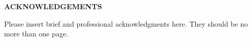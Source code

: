 


\begin{center}

\end{center}
\begin{center}

{\bf\fontsize{14pt}{14.5pt}\selectfont \uppercase{Acknowledgements}}\\\vspace{1cm}
\end{center}






Please insert brief and professional acknowledgments here. They should be no more than one page.

